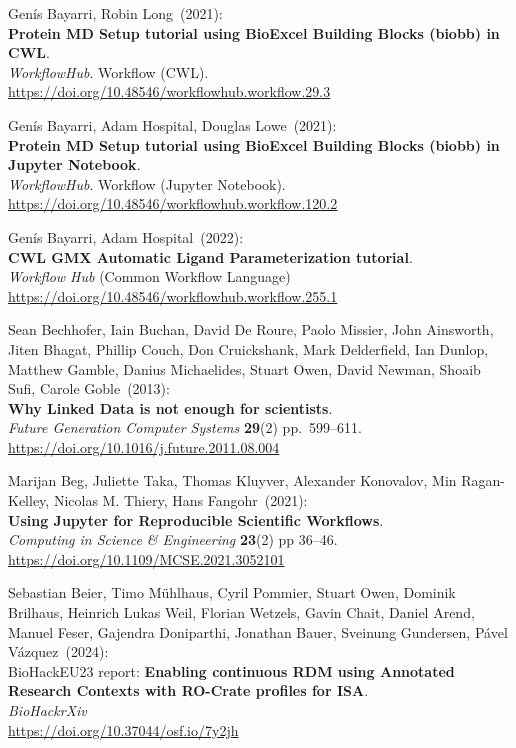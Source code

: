 \begin{thebibliography}{9}
Genís Bayarri, Robin Long~(2021): \\
\textbf{Protein MD Setup tutorial using BioExcel Building Blocks (biobb) in CWL}.\\
\emph{WorkflowHub}. Workflow (CWL).\\
\url{https://doi.org/10.48546/workflowhub.workflow.29.3}

Genís Bayarri, Adam Hospital, Douglas Lowe~(2021): \\
\textbf{Protein MD Setup tutorial using BioExcel Building Blocks (biobb) in Jupyter Notebook}.\\
\emph{WorkflowHub}. Workflow (Jupyter Notebook).\\
\url{https://doi.org/10.48546/workflowhub.workflow.120.2}

Genís Bayarri, Adam Hospital~(2022): \\
\textbf{CWL GMX Automatic Ligand Parameterization tutorial}.\\
\emph{Workflow Hub} (Common Workflow Language)\\
\url{https://doi.org/10.48546/workflowhub.workflow.255.1}

Sean Bechhofer, Iain Buchan, David De Roure, Paolo Missier, John Ainsworth, Jiten Bhagat, Phillip Couch, Don Cruickshank, Mark Delderfield, Ian Dunlop, Matthew Gamble, Danius Michaelides, Stuart Owen, David Newman, Shoaib Sufi, Carole Goble~(2013): \\
\textbf{Why Linked Data is not enough for scientists}.\\
\emph{Future Generation Computer Systems} \textbf{29}(2)
pp.~599--611.\\
\url{https://doi.org/10.1016/j.future.2011.08.004}

Marijan Beg, Juliette Taka, Thomas Kluyver, Alexander Konovalov, Min Ragan-Kelley, Nicolas M. Thiery, Hans Fangohr~(2021): \\
\textbf{Using Jupyter for Reproducible Scientific Workflows}.\\
\emph{Computing in Science \& Engineering} \textbf{23}(2) pp 36--46.\\
\url{https://doi.org/10.1109/MCSE.2021.3052101}

Sebastian Beier, Timo Mühlhaus, Cyril Pommier, Stuart Owen, Dominik Brilhaus, Heinrich Lukas Weil, Florian Wetzels, Gavin Chait, Daniel Arend, Manuel Feser, Gajendra Doniparthi, Jonathan Bauer, Sveinung Gundersen, Pável Vázquez~(2024): \\
BioHackEU23 report: \textbf{Enabling continuous RDM using Annotated Research Contexts with RO-Crate profiles for ISA}. \\
\emph{BioHackrXiv} \\
\url{https://doi.org/10.37044/osf.io/7y2jh}


\end{thebibliography}
